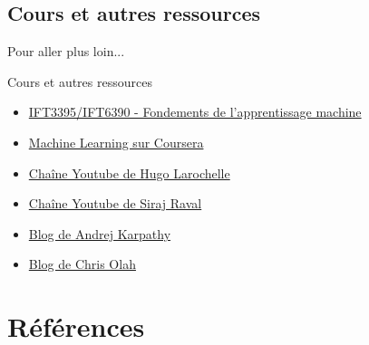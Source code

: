 \documentclass[french]{beamer}
\begin{document}
\subsection{Cours et autres ressources}

\begin{frame}{Pour aller plus loin...}

	Cours et autres ressources
	\begin{itemize}
		\item \href{https://admission.umontreal.ca/cours-et-horaires/cours/IFT-3395/}{IFT3395/IFT6390 - Fondements de l'apprentissage machine}
		\item \href{https://www.coursera.org/learn/machine-learning}{Machine Learning sur Coursera}
		\item \href{https://www.youtube.com/user/hugolarochelle}{Chaîne Youtube de Hugo Larochelle}
		\item \href{https://www.youtube.com/channel/UCWN3xxRkmTPmbKwht9FuE5A?&ab_channel=SirajRaval}{Chaîne Youtube de Siraj Raval}
		\item \href{http://karpathy.github.io}{Blog de Andrej Karpathy}	
		\item \href{http://colah.github.io/}{Blog de Chris Olah}		
	\end{itemize}
	
\end{frame}

\section*{Références}

\end{document}
